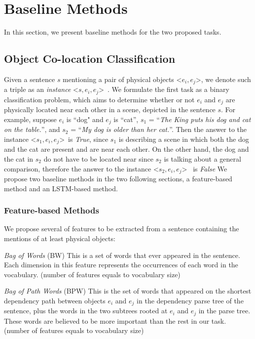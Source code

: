\section{Baseline Methods}
\label{sec:method}
In this section, we present baseline methods for 
the two proposed tasks. 

\subsection{Object Co-location Classification}
\label{sec:classify} 
Given a sentence $s$ mentioning a pair of physical objects 
\textless$e_i,e_j$\textgreater, 
we denote such a triple as an \textit{instance} \textless$s,e_i,e_j$\textgreater~. 
We formulate the first task as a binary classification problem, which aims to determine whether or not $e_i$ and $e_j$ are physically located near each other 
in a scene, depicted in the sentence $s$.
For example, suppose $e_i$ is ``dog" and $e_j$ is ``cat'', $s_1$ = ``\textit{The King puts his dog and cat on the table.}'', 
and $s_2$ = ``\textit{My dog is older than her cat.}''.
Then the answer to the instance \textless$s_1,e_i,e_j$\textgreater ~is \textit{True}, 
since $s_1$ is describing a scene in which both the dog and the cat are present
and are near each other.
On the other hand, the dog and the cat in $s_2$ do not have to be 
located near since $s_2$ is talking about a general comparison, 
therefore the answer to  the instance \textless$s_2,e_i,e_j$\textgreater~
is \textit{False}
We propose two baseline methods in the two following sections, 
a feature-based method and an LSTM-based method.

\subsubsection{Feature-based Methods}
We propose several of features to be extracted from 
a sentence containing the mentions of at least physical objects:

\noindent
\textit{Bag of Words} (BW)
This is a set of words that ever appeared in
the sentence. Each dimension in this feature represents the occurrences of each word in the vocabulary. (number of features equals to vocabulary size)

\noindent
\textit{Bag of Path Words} (BPW)
This is the set of words that appeared on
the shortest dependency path between objects $e_i$ and $e_j$ in the dependency parse
tree of the sentence, plus the words in the two subtrees rooted at $e_i$ and
$e_j$ in the parse tree. These words are believed to be more important
than the rest in our task. (number of features equals to vocabulary size)

